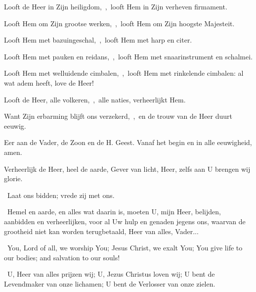 \documentclass[12pt,twoside,a5paper]{article}
\begin{document}
\begin{halfparskip}
   Looft de Heer in Zijn heiligdom,~\sep\ looft Hem in Zijn verheven firmament.

  Looft Hem om Zijn grootse werken,~\sep\ looft Hem om Zijn hoogste Majesteit.

  Looft Hem met bazuingeschal,~\sep\ looft Hem met harp en citer.

  Looft Hem met pauken en reidans,~\sep\ looft Hem met snaarinstrument en schalmei.

  Looft Hem met welluidende cimbalen,~\sep\ looft Hem met rinkelende cimbalen: al wat adem heeft, love de Heer!
\end{halfparskip}

\begin{halfparskip}
   Looft de Heer, alle volkeren,~\sep\ alle naties, verheerlijkt Hem.

  Want Zijn erbarming blijft ons verzekerd,~\sep\ en de trouw van de Heer duurt eeuwig.

  Eer aan de Vader, de Zoon en de H. Geest. Vanaf het begin en in alle eeuwigheid, amen.

  Verheerlijk de Heer, heel de aarde, Gever van licht, Heer, zelfs aan U brengen wij glorie.
\end{halfparskip}

\begin{halfparskip}
  \dd~Laat ons bidden; vrede zij met ons.

  \cc~Hemel en aarde, en alles wat daarin is, moeten U, mijn Heer, belijden, aanbidden en verheerlijken, voor al Uw hulp en genaden jegens ons, waarvan de grootheid niet kan worden terugbetaald, Heer van alles, Vader...
\end{halfparskip}



\begin{doublecols}
  \englishl \rr~You, Lord of all, we worship You; Jesus Christ, we exalt You; You give life to our bodies; and salvation to our souls!

   \rr~U, Heer van alles prijzen wij; U, Jezus Christus loven wij; U bent de Levendmaker van onze lichamen; U bent de Verlosser van onze zielen.
\end{doublecols}
\end{document}

